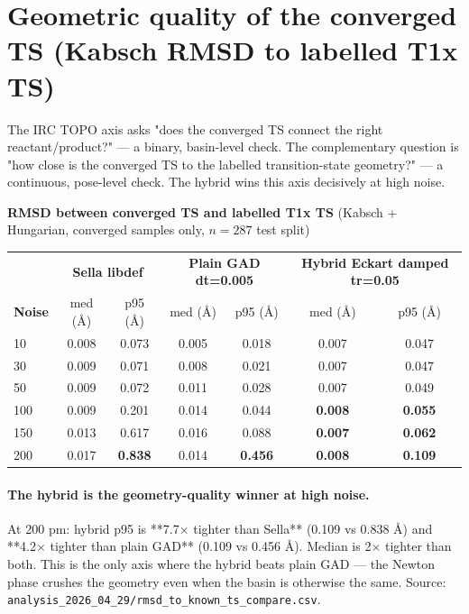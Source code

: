\documentclass[11pt]{article}
\begin{document}
\section*{Geometric quality of the converged TS (Kabsch RMSD to labelled T1x TS)}

The IRC TOPO axis asks "does the converged TS connect the right
reactant/product?" --- a binary, basin-level check. The complementary
question is "how close is the converged TS to the labelled
transition-state geometry?" --- a continuous, pose-level check. The
hybrid wins this axis decisively at high noise.

\begin{center}\small
\textbf{RMSD between converged TS and labelled T1x TS} (Kabsch + Hungarian, converged samples only, $n=287$ test split)\\[0.4em]
\begin{tabular}{l|cc|cc|cc}
\toprule
& \multicolumn{2}{c|}{\textbf{Sella libdef}} & \multicolumn{2}{c|}{\textbf{Plain GAD dt=0.005}} & \multicolumn{2}{c}{\textbf{Hybrid Eckart damped tr=0.05}} \\
\textbf{Noise} & med (Å) & p95 (Å) & med (Å) & p95 (Å) & med (Å) & p95 (Å) \\
\midrule
10  & 0.008 & 0.073 & 0.005 & 0.018 & 0.007 & 0.047 \\
30  & 0.009 & 0.071 & 0.008 & 0.021 & 0.007 & 0.047 \\
50  & 0.009 & 0.072 & 0.011 & 0.028 & 0.007 & 0.049 \\
100 & 0.009 & 0.201 & 0.014 & 0.044 & \textbf{0.008} & \textbf{0.055} \\
150 & 0.013 & 0.617 & 0.016 & 0.088 & \textbf{0.007} & \textbf{0.062} \\
200 & 0.017 & \textbf{0.838} & 0.014 & \textbf{0.456} & \textbf{0.008} & \textbf{0.109} \\
\bottomrule
\end{tabular}
\end{center}

\paragraph{The hybrid is the geometry-quality winner at high noise.}
At 200 pm: hybrid p95 is **7.7$\times$ tighter than Sella** (0.109
vs 0.838 Å) and **4.2$\times$ tighter than plain GAD** (0.109 vs 0.456
Å). Median is 2$\times$ tighter than both. This is the only axis where
the hybrid beats plain GAD --- the Newton phase crushes the geometry
even when the basin is otherwise the same. Source:
\texttt{analysis\_2026\_04\_29/rmsd\_to\_known\_ts\_compare.csv}.
\end{document}
